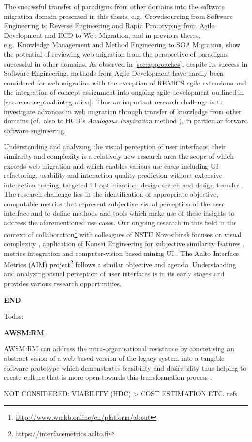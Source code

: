The successful transfer of paradigms from other domains into the software migration domain presented in this thesis, e.g.~Crowdsourcing from Software Engineering to Reverse Engineering and Rapid Prototyping from Agile Development and HCD to Web Migration, and in previous theses, e.g.~Knowledge Management \autocite{Razavian2013PHD} and Method Engineering \autocite{Khadka2016PHD} to SOA Migration, show the potential of reviewing web migration from the perspective of paradigms successful in other domains.
As observed in \cref{sec:approaches}, despite its success in Software Engineering, methods from Agile Development have hardly been considered for web migration with the exception of REMICS agile extensions \autocite{Krasteva2013REMICSAgile} and the integration of concept assignment into ongoing agile development outlined in \cref{sec:re.conceptual.integration}.
Thus an important research challenge is to investigate advances in web migration through transfer of knowledge from other domains (cf.~also to HCD's \emph{Analogous Inspiration} method \autocite{HCD2015}), in particular forward software engineering.

Understanding and analyzing the visual perception of user interfaces, their similarity and complexity is a relatively new research area the scope of which exceeds web migration and which enables various use cases including UI refactoring, usability and interaction quality prediction without extensive interaction tracing, targeted UI optimization, design search and design transfer \autocite{Bakaev2019JWE}.
The research challenge lies in the identification of appropriate objective, computable metrics that represent subjective visual perception of the user interface and to define methods and tools which make use of these insights to address the aforementioned use cases.
Our ongoing research in this field in the context of collaboration\footnote{\url{http://www.wuikb.online/en/platform/about}} with colleagues of NSTU Novosibirsk focuses on visual complexity \autocite{Bakaev2018APEIE}, application of Kansei Engineering for subjective similarity features \autocite{Bakaev2017Kansei}, metrics integration \autocite{Bakaev2019ICWE} and computer-vision based mining UI \autocite{Bakaev2018ICWE}.
The Aalto Interface Metrics (AIM) \autocite{Oulasvirta2018AIM} project\footnote{\url{https://interfacemetrics.aalto.fi}} follows a similar objective and agenda.
Understanding and analyzing visual perception of user interfaces is in its early stages and provides various research opportunities.

\textbf{END}

Todos:

\textbf{AWSM:RM}

AWSM:RM can address the intra-organisational resistance \autocite{Khadka2014ProfessionalsModernization,Sneed2010ReMiP} by concretising an abstract vision of a web-based version of the legacy system into a tangible software prototype which demonstrates feasibility and desirability thus helping to create culture that is more open towards this transformation process \autocite{Gartner2016Culture}.

NOT CONSIDERED: VIABILITY (HDC) \textgreater{} COST ESTIMATION ETC.
refs
